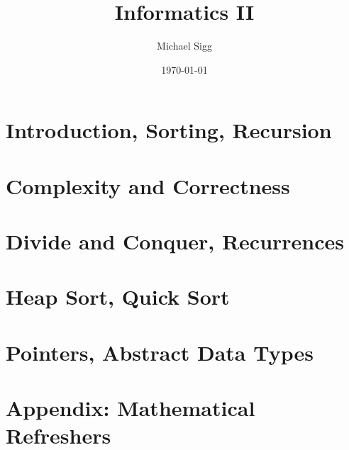 \documentclass[11pt]{article}
\title{Informatics II}
\author{Michael Sigg}
\date{\today}
\begin{document}
\maketitle
\tableofcontents

\newpage

\section{Introduction, Sorting, Recursion}


\section{Complexity and Correctness}


\section{Divide and Conquer, Recurrences}


\section{Heap Sort, Quick Sort}


\section{Pointers, Abstract Data Types}



\newpage
\section{Appendix: Mathematical Refreshers}

\end{document}
